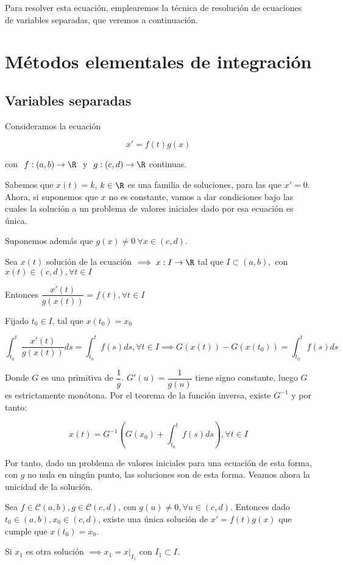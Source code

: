 Para resolver esta ecuación, emplearemos la técnica de resolución de ecuaciones de variables separadas, que veremos a continuación. 



\section{Métodos elementales de integración}


\subsection{Variables separadas}


Consideramos la ecuación

\[
x' = f(t)g(x)
\]

con $\ f:(a,b)\to \R \ $ y $\ g:(c,d) \to \R$ continuas.

Sabemos que $x(t) = k$, $k \in \R$ es una familia de soluciones, para las que $x' = 0$. Ahora, si suponemos que $x$
no es constante, vamos a dar condiciones bajo las cuales la solución a un problema de valores iniciales dado por esa
ecuación es única.

Suponemos además que $g(x) \neq 0 \ \forall x\in (c,d)$.

Sea $x(t)$ solución de la ecuación $\implies x:I \to \R$ tal que $I\subset (a,b),$ con $ x(t)\in (c,d), \forall t \in I$

Entonces $\dfrac{x'(t)}{g(x(t))} = f(t), \forall t \in I$

Fijado $t_0 \in I$, tal que $x(t_0) = x_0$

\[\int_{t_0}^{t}\frac{x'(t)}{g(x(t))} ds = \int_{t_0}^{t} f(s) ds, \forall t \in I \implies G(x(t)) - G(x(t_0)) = \int_{t_0}^{t}f(s) ds\]

Donde $G$ es una primitiva de $\dfrac{1}{g}$. $G'(u) = \dfrac{1}{g(u)}$ tiene signo constante, luego $G$ es estrictamente monótona. Por el teorema de la función inversa, existe $G^{-1}$ y por tanto:

\[x(t) = G^{-1}\left(G(x_0) + \int_{t_0}^{t}f(s) ds\right), \forall t \in I\]

Por tanto, dado un problema de valores iniciales para una ecuación de esta forma, con $g$ no nula en ningún punto, las soluciones son de esta forma. Veamos ahora la unicidad de la solución.

\begin{nth}
  Sea $f\in \mathscr{C}(a,b), g\in \mathscr{C}(c,d)$, con $g(u) \neq 0, \forall u \in (c,d)$. Entonces dado $t_0 \in (a,b), x_0 \in (c,d)$, existe una única solución de $x' = f(t)g(x)$ que cumple que $x(t_0) = x_0$.
  
Si $x_1$ es otra solución $\implies x_1 = x|_{I_1}$ con $I_1\subset I$.

\end{nth}


